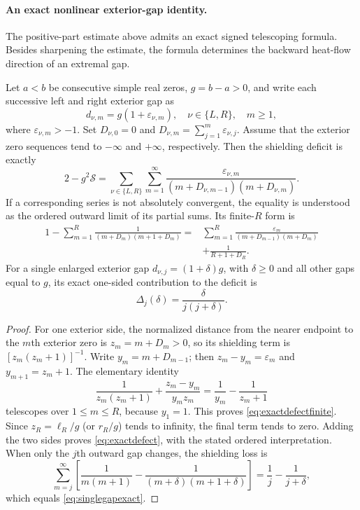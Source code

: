 \paragraph{An exact nonlinear exterior-gap identity.}
\label{par:exact-gap-shielding}
The positive-part estimate above admits an exact signed
telescoping formula. Besides sharpening the estimate, the
formula determines the backward heat-flow direction of an
extremal gap.

\begin{proposition}
\label{prop:exactexteriordefect}
Let $a<b$ be consecutive simple real zeros,
$g=b-a>0$, and write each successive left and right
exterior gap as
\[
d_{\nu,m}=g(1+\varepsilon_{\nu,m}),
\quad \nu\in\{L,R\},\quad m\ge1,
\]
where $\varepsilon_{\nu,m}>-1$.
Set $D_{\nu,0}=0$ and
$D_{\nu,m}=\sum_{j=1}^m\varepsilon_{\nu,j}$.
Assume that the exterior zero sequences tend to
$-\infty$ and $+\infty$, respectively.
Then the shielding deficit is exactly
\begin{equation}\label{eq:exactdefect}
\boxed{
2-g^2\mathcal S
=\sum_{\nu\in\{L,R\}}\sum_{m=1}^\infty
\frac{\varepsilon_{\nu,m}}
{(m+D_{\nu,m-1})(m+D_{\nu,m})}.}
\end{equation}
If a corresponding series is not absolutely convergent,
the equality is understood as the ordered outward limit
of its partial sums. Its finite-$R$ form is
\begin{align}
1-\sum_{m=1}^R
\frac1{(m+D_m)(m+1+D_m)}
={}&\sum_{m=1}^R
\frac{\varepsilon_m}
{(m+D_{m-1})(m+D_m)}
\nonumber\\
&+\frac1{R+1+D_R}.
\label{eq:exactdefectfinite}
\end{align}
For a single enlarged exterior gap
$d_{\nu,j}=(1+\delta)g$, with $\delta\ge0$
and all other gaps equal to $g$, its exact
one-sided contribution to the deficit is
\begin{equation}\label{eq:singlegapexact}
\boxed{\Delta_j(\delta)=
\frac{\delta}{j(j+\delta)}.}
\end{equation}
\end{proposition}
\begin{proof}
For one exterior side, the normalized distance from
the nearer endpoint to the $m$th exterior zero
is $z_m=m+D_m>0$, so its shielding term is
$[z_m(z_m+1)]^{-1}$.
Write $y_m=m+D_{m-1}$; then
$z_m-y_m=\varepsilon_m$ and
$y_{m+1}=z_m+1$.
The elementary identity
\[
\frac1{z_m(z_m+1)}
+\frac{z_m-y_m}{y_mz_m}
=\frac1{y_m}-\frac1{z_m+1}
\]
telescopes over $1\le m\le R$, because
$y_1=1$. This proves
\eqref{eq:exactdefectfinite}.
Since $z_R=\ell_R/g$ (or $r_R/g$)
tends to infinity, the final term tends to zero.
Adding the two sides proves \eqref{eq:exactdefect},
with the stated ordered interpretation.
When only the $j$th outward gap changes,
the shielding loss is
\[
\sum_{m=j}^\infty
\left[\frac1{m(m+1)}
-\frac1{(m+\delta)(m+1+\delta)}\right]
=\frac1j-\frac1{j+\delta},
\]
which equals \eqref{eq:singlegapexact}.
\end{proof}

